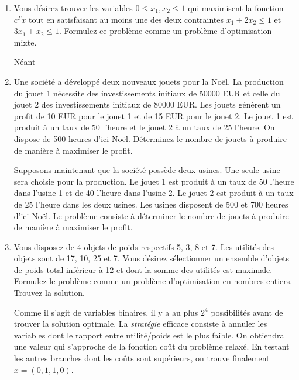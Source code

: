 \begin{enumerate}
  \item Vous désirez trouver les variables $0 \leq x_1, x_2 \leq 1$ qui maximisent la fonction $c^T x$ tout en satisfaisant au
    moins une  des deux contraintes $x_1 + 2 x_2 \leq 1$  et  $3 x_1 +  x_2 \leq 1$. Formulez ce problème comme un
    problème d'optimisation mixte.



    \begin{solution}
      Néant
    \end{solution}

  \item Une société a développé deux nouveaux jouets pour la Noël. La production du jouet 1 nécessite des investissements initiaux de
    50000 EUR et celle du jouet 2 des investissements initiaux de 80000 EUR. Les jouets
    génèrent un profit de 10 EUR pour le jouet 1 et de 15 EUR pour le jouet 2.  Le jouet 1 est
    produit à un taux de 50 l'heure et le jouet 2 à un taux de 25 l'heure. On dispose  de 500 heures
    d'ici Noël. Déterminez le nombre de jouets à produire de manière à maximiser le profit.


    Supposons maintenant que la société possède deux usines. Une seule usine sera choisie pour la production. Le
    jouet 1 est produit à un taux de 50 l'heure dans l'usine 1 et de 40 l'heure dans l'usine 2. Le jouet 2 est produit à un taux de
    25 l'heure dans les deux usines. Les usines disposent de 500 et 700 heures d'ici Noël.  Le problème consiste à déterminer le
    nombre de jouets à produire de manière à maximiser le profit.












    \begin{solution}
    \end{solution}

  \item Vous disposez de 4 objets de poids respectifs 5, 3, 8 et 7. Les utilités des
    objets sont de 17, 10, 25 et 7. Vous désirez sélectionner un ensemble d'objets de poids total inférieur  à 12 et dont la somme
    des utilités est maximale.  Formulez le problème comme un problème d'optimisation en nombres entiers. Trouvez la solution.


    \begin{solution}
      Comme il s'agit de variables binaires, il y a au plus $2^{4}$ possibilités avant de trouver la solution optimale. La \textit{stratégie} efficace consiste à annuler les variables dont le rapport entre utilité/poids est le plus faible. On obtiendra une valeur qui s'approche de la fonction coût du problème relaxé. En testant les autres branches dont les coûts sont supérieurs, on trouve finalement $x = (0,1,1,0)$.
    \end{solution}


\end{enumerate}

